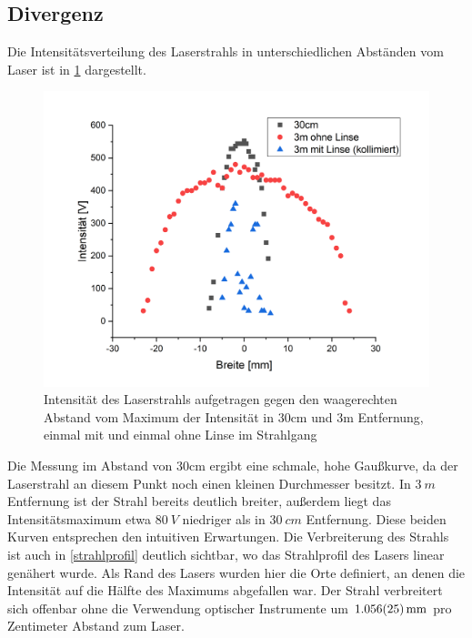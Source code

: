\documentclass[
	a4paper,
	12pt,
	pagesize,
	ngerman
]{scrartcl}
\begin{document}
\subsection{Divergenz}
Die Intensitätsverteilung des Laserstrahls in unterschiedlichen Abständen vom Laser ist in \cref{breite} dargestellt.

\begin{figure}[h!]
	\centering
	\includegraphics[scale=0.7]{breite.png}
	\caption{Intensität des Laserstrahls aufgetragen gegen den waagerechten Abstand vom Maximum der Intensität in 30cm und 3m Entfernung, einmal mit und einmal ohne Linse im Strahlgang}
	\label{breite}
\end{figure}

Die Messung im Abstand von 30cm ergibt eine schmale, hohe Gaußkurve, da der Laserstrahl an diesem Punkt noch einen kleinen Durchmesser besitzt. In $\SI{3}{m}$ Entfernung ist der Strahl bereits deutlich breiter, außerdem liegt das Intensitätsmaximum etwa $\SI{80}{V}$ niedriger als in $\SI{30}{cm}$ Entfernung. Diese beiden Kurven entsprechen den intuitiven Erwartungen. Die Verbreiterung des Strahls ist auch in \cref{strahlprofil} deutlich sichtbar, wo das Strahlprofil des Lasers linear genähert wurde. Als Rand des Lasers wurden hier die Orte definiert, an denen die Intensität auf die Hälfte des Maximums abgefallen war. Der Strahl verbreitert sich offenbar ohne die Verwendung optischer Instrumente um $\SI{1,056\pm0,025}{mm}$ pro Zentimeter Abstand zum Laser.
\end{document}
